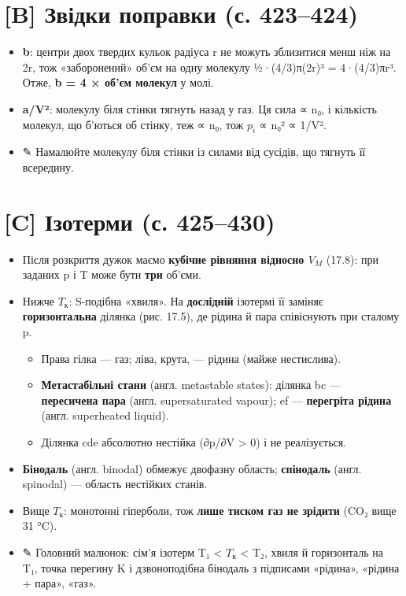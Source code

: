 \documentclass[11pt,a4paper,oneside]{book}
\newcommand{\pen}{{\sffamily\color{accent}✎}}
\begin{document}
\section*{[B] Звідки поправки (с. 423–424)}
\begin{itemize}
\item \textbf{b}: центри двох твердих кульок радіуса r не можуть зблизитися менш ніж на 2r, тож «заборонений» об'єм на одну молекулу ½·(4/3)π(2r)³ = 4·(4/3)πr³. Отже, \textbf{b = 4 × об'єм молекул} у молі.
\item \textbf{a/V²}: молекулу біля стінки тягнуть назад у газ. Ця сила ∝ n₀, і кількість молекул, що б'ються об стінку, теж ∝ n₀, тож $p_{i}$ ∝ n₀² ∝ 1/V².
\item \pen{} Намалюйте молекулу біля стінки із силами від сусідів, що тягнуть її всередину.
\end{itemize}

\section*{[C] Ізотерми (с. 425–430)}
\begin{itemize}
\item Після розкриття дужок маємо \textbf{кубічне рівняння відносно $V_{M}$} (17.8): при заданих p і T може бути \textbf{три} об'єми.
\item Нижче $T_{\text{к}}$: S-подібна «хвиля». На \textbf{дослідній} ізотермі її заміняє \textbf{горизонтальна} ділянка (рис. 17.5), де рідина й пара співіснують при сталому p.
\begin{itemize}
\item Права гілка — газ; ліва, крута, — рідина (майже нестислива).
\item \textbf{Метастабільні стани} (англ. metastable states): ділянка bc — \textbf{пересичена пара} (англ. supersaturated vapour); ef — \textbf{перегріта рідина} (англ. superheated liquid).
\item Ділянка cde абсолютно нестійка (∂p/∂V > 0) і не реалізується.
\end{itemize}
\item \textbf{Бінодаль} (англ. binodal) обмежує двофазну область; \textbf{спінодаль} (англ. spinodal) — область нестійких станів.
\item Вище $T_{\text{к}}$: монотонні гіперболи, тож \textbf{лише тиском газ не зрідити} (CO₂ вище 31 °C).
\item \pen{} Головний малюнок: сім'я ізотерм T₁ < $T_{\text{к}}$ < T₂, хвиля й горизонталь на T₁, точка перегину K і дзвоноподібна бінодаль з підписами «рідина», «рідина + пара», «газ».
\end{itemize}
\end{document}

